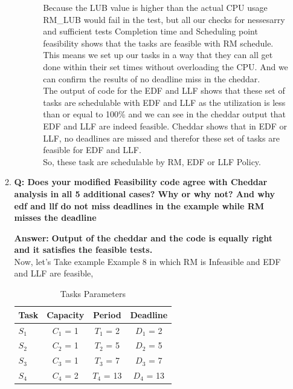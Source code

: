 \documentclass[a4paper,11pt]{article}%
\newenvironment{qanda}{\setlength{\parindent}{0pt}}{\bigskip}
\newcommand{\Q}{\bigskip\bfseries Q: }
\newcommand{\A}{\par\textbf{Answer: } \normalfont}
\begin{document}
\begin{qanda}
\begin{enumerate}
\begin{enumerate}
\begin{enumerate}
\begin{enumerate}
						                  Because the LUB value is higher than the actual CPU usage RM\_LUB would fail in the test, but all our checks for nessesarry and sufficient tests Completion time and Scheduling point feasibility shows that the tasks are feasible with RM schedule. This means we set up our tasks in a way that they can all get done within their set times without overloading the CPU. And we can confirm the results of no deadline miss in the cheddar.\\

						                  The output of code for the EDF and LLF shows that these set of tasks are schedulable with EDF and LLF as the utilization is less than or equal to 100\% and we can see in the cheddar output that EDF and LLF are indeed feasible. Cheddar shows that in EDF or LLF, no deadlines are missed and therefor these set of tasks are feasible for EDF and LLF.\\

						                  So, these task are schedulable by RM, EDF or LLF Policy.

					            \end{enumerate}
				      \end{enumerate}


				\item \Q Does your modified Feasibility code agree with Cheddar analysis in all 5 additional cases? Why or why not? And why edf and llf do not miss deadlines in the example while RM misses the deadline
				      \A
				      \textbf{Output of the cheddar and the code is equally right and it satisfies the feasible tests.}\\

				      Now, let's Take example Example 8 in which RM is Infeasible and EDF and LLF are feasible,\\
				      \begin{table}[H]
					      \centering
					      \caption{Tasks Parameters}
					      \label{tab:example}
					      \begin{tabular}{l c c c} %
						      \hline
						      Task  & Capacity  & Period     & Deadline   \\ \hline
						      $S_1$ & $C_1$ = 1 & $T_1$ = 2  & $D_1$ = 2  \\
						      $S_2$ & $C_2$ = 1 & $T_2$ = 5  & $D_2$ = 5  \\
						      $S_3$ & $C_3$ = 1 & $T_3$ = 7  & $D_3$ = 7  \\
						      $S_4$ & $C_4$ = 2 & $T_4$ = 13 & $D_4$ = 13 \\
						      \hline
					      \end{tabular}
				      \end{table}




\end{enumerate}
\end{enumerate}
\end{qanda}
\end{document}
